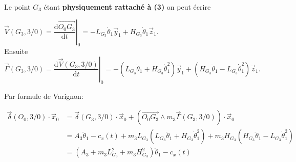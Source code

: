 \ifprof
\begin{corrige}
Le point $G_3$ étant \textbf{physiquement rattaché à (3)} on peut écrire 

$\boxed{\overrightarrow{V}(G_3,3/0) = \left. \dfrac{\mathrm{d}\overrightarrow{O_0 G_3}}{\mathrm{d}t} \right|_0 = -L_{G_3}\dot{\theta}_1\overrightarrow{y}_1 + H_{G_3}\dot{\theta}_1\overrightarrow{z}_1}$.\\

Ensuite $\boxed{\overrightarrow{\Gamma}(G_3,3/0) = \left. \dfrac{\mathrm{d}\overrightarrow{V}(G_3,3/0)}{\mathrm{d}t} \right|_0 = -\left(L_{G_3}\ddot{\theta}_1 + H_{G_3}\dot{\theta}_1^2\right)\overrightarrow{y}_1 + \left(H_{G_3}\ddot{\theta}_1 - L_{G_3}\dot{\theta}_1^2\right)\overrightarrow{z}_1}$.

\end{corrige}
\else
\fi

\ifprof
\begin{corrige}
Par formule de Varignon:

\begin{align*}
\overrightarrow{\delta}(O_0,3/0)\cdot \overrightarrow{x}_0 &= \overrightarrow{\delta}(G_3,3/0)\cdot \overrightarrow{x}_0 + \left( \overrightarrow{O_0 G_3} \wedge m_3\overrightarrow{\Gamma}(G_3,3/0) \right)\cdot \overrightarrow{x}_0 \\
&= A_3 \ddot{\theta}_1 - c_x(t) +m_3L_{G_3}\left(L_{G_3}\ddot{\theta}_1 + H_{G_3}\dot{\theta}_1^2\right) + m_3 H_{G_3}\left(H_{G_3}\ddot{\theta}_1 - L_{G_3}\dot{\theta}_1^2\right)\\
&= \left(A_3 +m_3L_{G_3}^2 +m_3H_{G_3}^2\right) \ddot{\theta}_1 - c_x(t)
\end{align*}
 

\end{corrige}
\else
\fi

